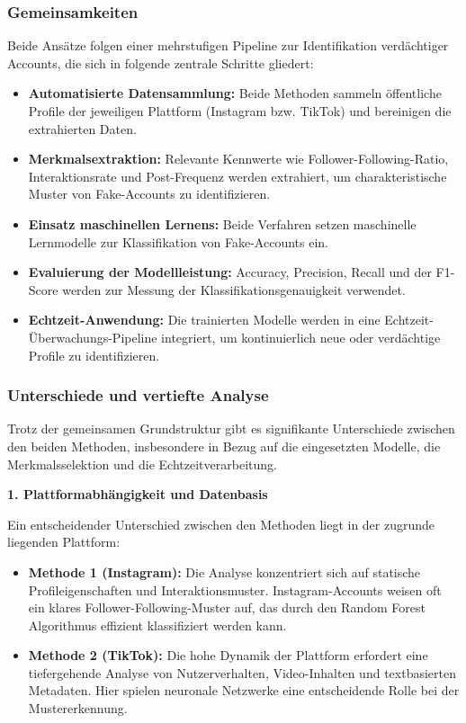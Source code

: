 \documentclass[12pt]{report}
\begin{document}
\subsubsection{Gemeinsamkeiten}

Beide Ansätze folgen einer mehrstufigen Pipeline zur Identifikation verdächtiger Accounts, die sich in folgende zentrale Schritte gliedert:

\begin{itemize}
	\item \textbf{Automatisierte Datensammlung:} Beide Methoden sammeln öffentliche Profile der jeweiligen Plattform (Instagram bzw. TikTok) und bereinigen die extrahierten Daten.
	\item \textbf{Merkmalsextraktion:} Relevante Kennwerte wie Follower-Following-Ratio, Interaktionsrate und Post-Frequenz werden extrahiert, um charakteristische Muster von Fake-Accounts zu identifizieren.
	\item \textbf{Einsatz maschinellen Lernens:} Beide Verfahren setzen maschinelle Lernmodelle zur Klassifikation von Fake-Accounts ein.
	\item \textbf{Evaluierung der Modellleistung:} Accuracy, Precision, Recall und der F1-Score werden zur Messung der Klassifikationsgenauigkeit verwendet.
	\item \textbf{Echtzeit-Anwendung:} Die trainierten Modelle werden in eine Echtzeit-Überwachungs-Pipeline integriert, um kontinuierlich neue oder verdächtige Profile zu identifizieren.
\end{itemize}

\subsubsection{Unterschiede und vertiefte Analyse}

Trotz der gemeinsamen Grundstruktur gibt es signifikante Unterschiede zwischen den beiden Methoden, insbesondere in Bezug auf die eingesetzten Modelle, die Merkmalsselektion und die Echtzeitverarbeitung.

\textbf{1. Plattformabhängigkeit und Datenbasis}

Ein entscheidender Unterschied zwischen den Methoden liegt in der zugrunde liegenden Plattform:

\begin{itemize}
	\item \textbf{Methode 1 (Instagram):} Die Analyse konzentriert sich auf statische Profileigenschaften und Interaktionsmuster. Instagram-Accounts weisen oft ein klares Follower-Following-Muster auf, das durch den Random Forest Algorithmus effizient klassifiziert werden kann.
	\item \textbf{Methode 2 (TikTok):} Die hohe Dynamik der Plattform erfordert eine tiefergehende Analyse von Nutzerverhalten, Video-Inhalten und textbasierten Metadaten. Hier spielen neuronale Netzwerke eine entscheidende Rolle bei der Mustererkennung.
\end{itemize}
\end{document}
